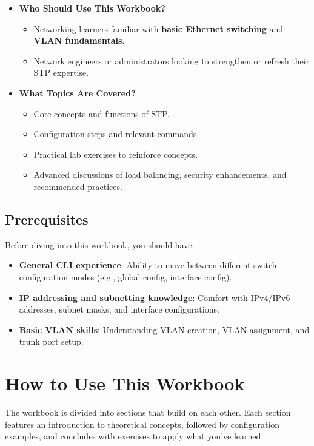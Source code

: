 \documentclass[a4paper]{report}
\begin{document}
\begin{itemize}
  \item \textbf{Who Should Use This Workbook?}
  \begin{itemize}
    \item Networking learners familiar with \textbf{basic Ethernet switching} and \textbf{VLAN fundamentals}.
    \item Network engineers or administrators looking to strengthen or refresh their STP expertise.
  \end{itemize}
  \item \textbf{What Topics Are Covered?}
  \begin{itemize}
    \item Core concepts and functions of STP.
    \item Configuration steps and relevant commands.
    \item Practical lab exercises to reinforce concepts.
    \item Advanced discussions of load balancing, security enhancements, and recommended practices.
  \end{itemize}
\end{itemize}

\subsection{Prerequisites}
Before diving into this workbook, you should have:
\begin{itemize}
  \item \textbf{General CLI experience}: Ability to move between different switch configuration modes (e.g., global config, interface config).
  \item \textbf{IP addressing and subnetting knowledge}: Comfort with IPv4/IPv6 addresses, subnet masks, and interface configurations.
  \item \textbf{Basic VLAN skills}: Understanding VLAN creation, VLAN assignment, and trunk port setup.
\end{itemize}

\section{How to Use This Workbook}
The workbook is divided into sections that build on each other. Each section features an introduction to theoretical concepts, followed by configuration examples, and concludes with exercises to apply what you’ve learned.
\end{document}
